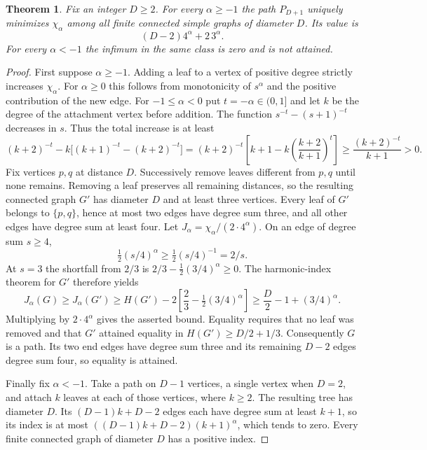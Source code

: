 \documentclass[11pt,a4paper]{article}
\newtheorem{theorem}{Theorem}[section]
\begin{document}
\begin{theorem}\label{thm:sum-halfline}
Fix an integer $D\ge2$. For every $\alpha\ge-1$ the path $P_{D+1}$ uniquely minimizes $\chi_\alpha$ among all finite connected simple graphs of diameter $D$. Its value is
\[
    (D-2)4^\alpha+2\,3^\alpha.
\]
For every $\alpha<-1$ the infimum in the same class is zero and is not attained.
\end{theorem}

\begin{proof}
First suppose $\alpha\ge-1$. Adding a leaf to a vertex of positive degree strictly increases $\chi_\alpha$. For $\alpha\ge0$ this follows from monotonicity of $s^\alpha$ and the positive contribution of the new edge. For $-1\le\alpha<0$ put $t=-\alpha\in(0,1]$ and let $k$ be the degree of the attachment vertex before addition. The function $s^{-t}-(s+1)^{-t}$ decreases in $s$. Thus the total increase is at least
\[
 (k+2)^{-t}-k\big[(k+1)^{-t}-(k+2)^{-t}\big]
 =(k+2)^{-t}\left[k+1-k\left(\frac{k+2}{k+1}\right)^t\right]
 \ge\frac{(k+2)^{-t}}{k+1}>0 .
\]
Fix vertices $p,q$ at distance $D$. Successively remove leaves different from $p,q$ until none remains. Removing a leaf preserves all remaining distances, so the resulting connected graph $G'$ has diameter $D$ and at least three vertices. Every leaf of $G'$ belongs to $\{p,q\}$, hence at most two edges have degree sum three, and all other edges have degree sum at least four. Let
$J_\alpha=\chi_\alpha/(2\cdot4^\alpha)$. On an edge of degree sum $s\ge4$,
\[
 \tfrac12(s/4)^\alpha\ge \tfrac12(s/4)^{-1}=2/s .
\]
At $s=3$ the shortfall from $2/3$ is $2/3-\tfrac12(3/4)^\alpha\ge0$. The harmonic-index theorem for $G'$ therefore yields
\[
 J_\alpha(G)\ge J_\alpha(G')
 \ge H(G')-2\left[\frac23-\tfrac12(3/4)^\alpha\right]
 \ge \frac D2-1+(3/4)^\alpha.
\]
Multiplying by $2\cdot4^\alpha$ gives the asserted bound. Equality requires that no leaf was removed and that $G'$ attained equality in $H(G')\ge D/2+1/3$. Consequently $G$ is a path. Its two end edges have degree sum three and its remaining $D-2$ edges degree sum four, so equality is attained.

Finally fix $\alpha<-1$. Take a path on $D-1$ vertices, a single vertex when $D=2$, and attach $k$ leaves at each of those vertices, where $k\ge2$. The resulting tree has diameter $D$. Its $(D-1)k+D-2$ edges each have degree sum at least $k+1$, so its index is at most $((D-1)k+D-2)(k+1)^\alpha$, which tends to zero. Every finite connected graph of diameter $D$ has a positive index.
\end{proof}
\end{document}
